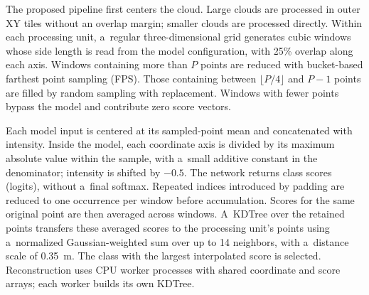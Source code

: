 The proposed pipeline first centers the cloud. Large clouds are processed in outer XY tiles without an overlap margin; smaller clouds are processed directly. Within each processing unit, a~regular three-dimensional grid generates cubic windows whose side length is read from the model configuration, with 25\% overlap along each axis. Windows containing more than $P$ points are reduced with bucket-based farthest point sampling (FPS). Those containing between $\lfloor P/4\rfloor$ and $P-1$ points are filled by random sampling with replacement. Windows with fewer points bypass the model and contribute zero score vectors.

Each model input is centered at its sampled-point mean and concatenated with intensity. Inside the model, each coordinate axis is divided by its maximum absolute value within the sample, with a~small additive constant in the denominator; intensity is shifted by $-0.5$. The network returns class scores (logits), without a~final softmax. Repeated indices introduced by padding are reduced to one occurrence per window before accumulation. Scores for the same original point are then averaged across windows. A~KDTree over the retained points transfers these averaged scores to the processing unit's points using a~normalized Gaussian-weighted sum over up to 14 neighbors, with a~distance scale of 0.35~m. The class with the largest interpolated score is selected. Reconstruction uses CPU worker processes with shared coordinate and score arrays; each worker builds its own KDTree.

